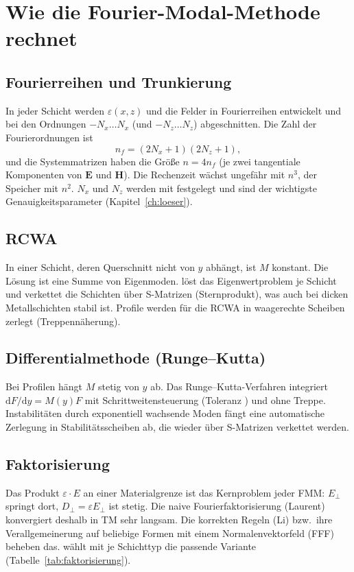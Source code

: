 \section{Wie die Fourier-Modal-Methode rechnet}
%
\subsection{Fourierreihen und Trunkierung}
In jeder Schicht werden $\varepsilon(x,z)$ und die Felder in Fourierreihen entwickelt und bei den Ordnungen
$-N_x\ldots N_x$ (und $-N_z\ldots N_z$) abgeschnitten. Die Zahl der Fourierordnungen ist
\begin{equation}
  n_f = (2N_x+1)(2N_z+1),
\end{equation}
und die Systemmatrizen haben die Größe $n=4n_f$ (je zwei tangentiale Komponenten von $\mathbf E$ und $\mathbf H$).
Die Rechenzeit wächst ungefähr mit $n^3$, der Speicher mit $n^2$. $N_x$ und $N_z$ werden mit 
festgelegt und sind der wichtigste Genauigkeitsparameter (Kapitel~\ref{ch:loeser}).

\subsection{RCWA}
In einer Schicht, deren Querschnitt nicht von $y$ abhängt, ist $M$ konstant. Die Lösung ist eine Summe von
Eigenmoden. \FG{} löst das Eigenwertproblem je Schicht und verkettet die Schichten über S-Matrizen
(Sternprodukt), was auch bei dicken Metallschichten stabil ist. Profile werden für die RCWA in
 waagerechte Scheiben zerlegt (Treppennäherung).

\subsection{Differentialmethode (Runge--Kutta)}
Bei Profilen hängt $M$ stetig von $y$ ab. Das Runge--Kutta-Verfahren integriert $\mathrm dF/\mathrm dy=M(y)F$ mit
Schrittweitensteuerung (Toleranz ) und ohne Treppe. Instabilitäten durch exponentiell wachsende Moden
fängt eine automatische Zerlegung in Stabilitätsscheiben ab, die wieder über S-Matrizen verkettet werden.

\subsection{Faktorisierung}
Das Produkt $\varepsilon\cdot E$ an einer Materialgrenze ist das Kernproblem jeder FMM: $E_\perp$ springt dort,
$D_\perp=\varepsilon E_\perp$ ist stetig. Die naive Fourierfaktorisierung (Laurent) konvergiert deshalb in TM sehr
langsam. Die korrekten Regeln (Li) bzw.\ ihre Verallgemeinerung auf beliebige Formen mit einem Normalenvektorfeld
(FFF) beheben das. \FG{} wählt mit  je Schichttyp die passende Variante (Tabelle~\ref{tab:faktorisierung}).

